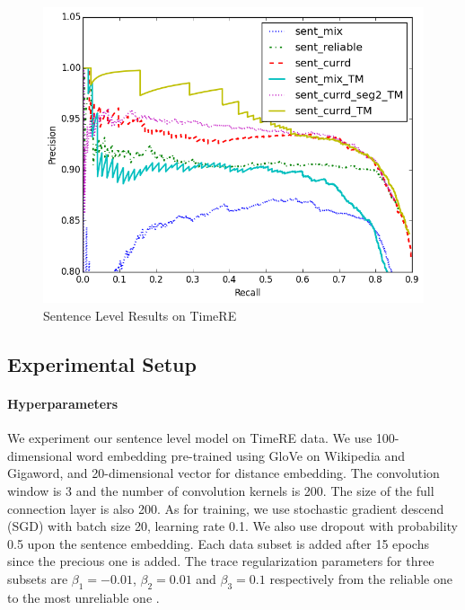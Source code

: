 \begin{figure}[htbp]
\begin{center}
\includegraphics[width=0.9\linewidth]{figures/sent_time_exp_overall.png}
\caption{Sentence Level Results on TimeRE}
\label{fig: sent_luo}
\end{center}
\end{figure}

\subsection{Experimental Setup}

\paragraph{Hyperparameters} 
We experiment our sentence level model on TimeRE data. We use 100-dimensional word embedding pre-trained using GloVe \cite{pennington2014glove} on Wikipedia and Gigaword, and 20-dimensional vector for distance embedding. The convolution window is 3 and the number of convolution kernels is 200. The size of the full connection layer is also 200. As for training, we use stochastic gradient descend (SGD) with batch size 20, learning rate 0.1. We also use dropout with probability 0.5 upon the sentence embedding. Each data subset is added after 15 epochs since the precious one is added. The trace regularization parameters for three subsets are $\beta_1=-0.01$, $\beta_2=0.01$ and $\beta_3=0.1$ respectively from the reliable one to the most unreliable one .


